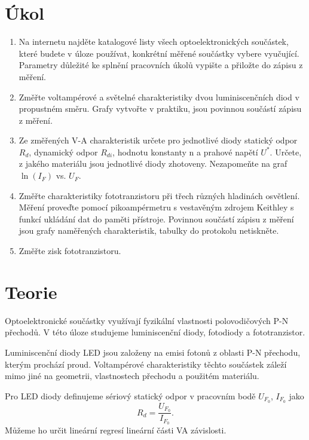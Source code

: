 \documentclass{protokol}
\begin{document}
  \section*{Úkol}

    \begin{enumerate}
      \item Na internetu najděte katalogové listy všech optoelektronických součástek, které budete v úloze používat, konkrétní měřené součástky vybere vyučující. Parametry důležité ke splnění pracovních úkolů vypište a přiložte do zápisu z měření.
      \item Změřte voltampérové a světelné charakteristiky dvou luminiscenčních diod v propustném směru. Grafy vytvořte v praktiku, jsou povinnou součástí zápisu z měření.
      \item Ze změřených V-A charakteristik určete pro jednotlivé diody statický odpor $R_d$, dynamický odpor $R_{di}$, hodnotu konstanty n a prahové napětí $U^*$. Určete, z jakého materiálu jsou jednotlivé diody zhotoveny. Nezapomeňte na graf $\ln(I_F)$ vs. $U_F$.
      \item Změřte charakteristiky fototranzistoru při třech různých hladinách osvětlení. Měření proveďte pomocí pikoampérmetru s vestavěným zdrojem Keithley s funkcí ukládání dat do paměti přístroje. Povinnou součástí zápisu z měření jsou grafy naměřených charakteristik, tabulky do protokolu netiskněte.
      \item Změřte zisk fototranzistoru.
    \end{enumerate}

  \section*{Teorie}

    Optoelektronické součástky využívají fyzikální vlastnosti polovodičových P-N přechodů. V této úloze studujeme luminiscenční diody, fotodiody a fototranzistor.

    Luminiscenční diody LED jsou založeny na emisi fotonů z oblasti P-N přechodu, kterým prochází proud. Voltampérové charakteristiky těchto součástek záleží mimo jiné na geometrii, vlastnostech přechodu a použitém materiálu.

    Pro LED diody definujeme sériový statický odpor v pracovním bodě $U_{F_0}$, $I_{F_0}$ jako 
    \begin{equation}
      R_d = \frac{U_{F_0}}{I_{F_0}}.
    \end{equation}
    Můžeme ho určit lineární regresí lineární části VA závislosti.
\end{document}
